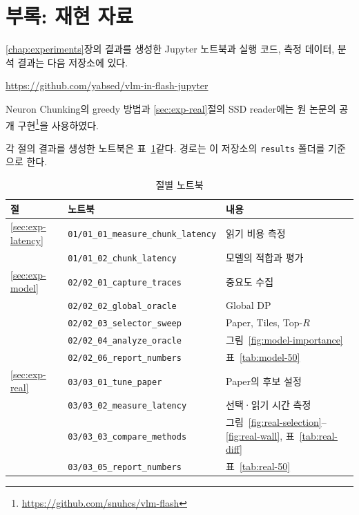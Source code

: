 \chapter*{부록: 재현 자료}\label{chap:appendix}

\setcounter{table}{0}
\renewcommand{\thetable}{A.\arabic{table}}

\ref{chap:experiments}장의 결과를 생성한 Jupyter 노트북과 실행 코드, 측정 데이터, 분석 결과는 다음 저장소에 있다.

\begin{center}
\url{https://github.com/yabsed/vlm-in-flash-jupyter}
\end{center}

Neuron Chunking의 greedy 방법과 \ref{sec:exp-real}절의 SSD reader에는 원 논문의 공개 구현\footnote{\url{https://github.com/snuhcs/vlm-flash}}을 사용하였다.

각 절의 결과를 생성한 노트북은 표~\ref{tab:notebooks}\와 같다. 경로는 이 저장소의 \texttt{results} 폴더를 기준으로 한다.

\begin{table}[htbp]
    \centering
    \caption{절별 노트북}
    \label{tab:notebooks}
    \begin{tabular}{lll}
        \toprule
        절 & 노트북 & 내용 \\
        \midrule
        \ref{sec:exp-latency} & \texttt{01/01\_01\_measure\_chunk\_latency} & 읽기 비용 측정 \\
                              & \texttt{01/01\_02\_chunk\_latency} & 모델의 적합과 평가 \\
        \midrule
        \ref{sec:exp-model}   & \texttt{02/02\_01\_capture\_traces} & 중요도 수집 \\
                              & \texttt{02/02\_02\_global\_oracle} & Global DP \\
                              & \texttt{02/02\_03\_selector\_sweep} & Paper, Tiles, Top-$R$ \\
                              & \texttt{02/02\_04\_analyze\_oracle} & 그림~\ref{fig:model-importance} \\
                              & \texttt{02/02\_06\_report\_numbers} & 표~\ref{tab:model-50} \\
        \midrule
        \ref{sec:exp-real}    & \texttt{03/03\_01\_tune\_paper} & Paper의 후보 설정 \\
                              & \texttt{03/03\_02\_measure\_latency} & 선택·읽기 시간 측정 \\
                              & \texttt{03/03\_03\_compare\_methods} & 그림~\ref{fig:real-selection}--\ref{fig:real-wall}, 표~\ref{tab:real-diff} \\
                              & \texttt{03/03\_05\_report\_numbers} & 표~\ref{tab:real-50} \\
        \bottomrule
    \end{tabular}
\end{table}
